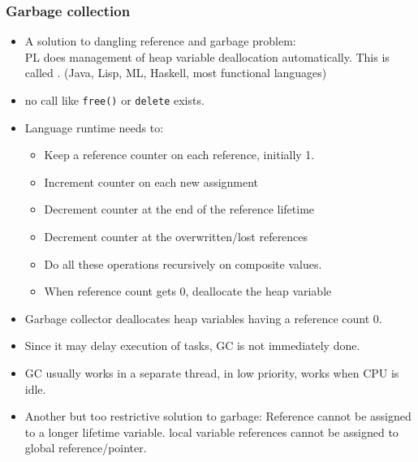 \begin{frame}
 \frametitle{Garbage collection}
 \begin{itemize}
  \item A solution to dangling reference and garbage problem: \\
	PL does management of heap variable deallocation automatically. This is called . (Java, Lisp, ML, Haskell, most functional languages)
  \item no call like \texttt{free()} or \texttt{delete} exists.
  \item Language runtime needs to:
	\begin{itemize}
		\item Keep a reference counter on each reference, initially 1.
		\item Increment counter on each new assignment
		\item Decrement counter at the end of the reference lifetime
		\item Decrement counter at the overwritten/lost references
		\item Do all these operations recursively on composite values.
		\item When reference count gets 0, deallocate the heap variable
	\end{itemize}
  \end{itemize}
 \end{frame}

\begin{frame}
 \begin{itemize}
  \item Garbage collector deallocates heap variables having a reference count 0.
  \item Since it may delay execution of tasks, GC is not immediately done.
  \item GC usually works in a separate thread, in low priority, works when CPU is idle.
  \item Another but too restrictive solution to garbage: Reference cannot be assigned to a longer lifetime variable.
	local variable references cannot be assigned to global reference/pointer.
 \end{itemize}
\end{frame}


